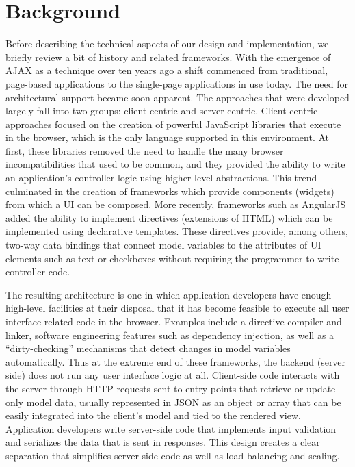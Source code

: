 \section{Background}
\label{sec:background}

Before describing the technical aspects of our design and implementation,
we briefly review a bit of history and related frameworks.
With the emergence of AJAX as a technique over ten years ago a shift commenced from traditional,
page-based applications to the single-page applications in use today. 
The need for architectural support became soon apparent.  The approaches 
that were developed largely fall into two groups: client-centric and server-centric.
Client-centric approaches focused on the creation of powerful JavaScript
libraries that execute in the browser, which is the only language supported
in this environment.  At first, these libraries removed the 
need to handle the many browser incompatibilities that used to be common, 
and they provided the ability to write an application's controller logic 
using higher-level abstractions.  This trend culminated in the creation of 
frameworks which provide components (widgets) from which a UI can be
composed.  More recently, frameworks such as AngularJS added the ability
to implement directives (extensions of HTML) which can be implemented using 
declarative templates.  These directives provide, among others, two-way data 
bindings that connect model variables to the attributes of UI elements such 
as text or checkboxes without requiring the programmer to write controller
code.

The resulting architecture is one in which application developers have enough
high-level facilities at their disposal that it has become feasible to execute 
all user interface related code in the browser.   
Examples include a directive compiler and linker, software engineering features 
such as dependency injection, as well as a ``dirty-checking'' mechanisms that 
detect changes in model variables automatically.
Thus at the extreme end of these frameworks, the backend 
(server side) does not run any user interface logic at all.  Client-side code
interacts with the server through HTTP requests sent to entry points that
retrieve or update only model data, usually represented in JSON as an object or array
that can be easily integrated into the client's model and tied to the rendered 
view.  Application developers write server-side code that implements input 
validation and serializes the data that is sent in responses.
This design creates a clear separation that simplifies server-side 
code as well as load balancing and scaling.

